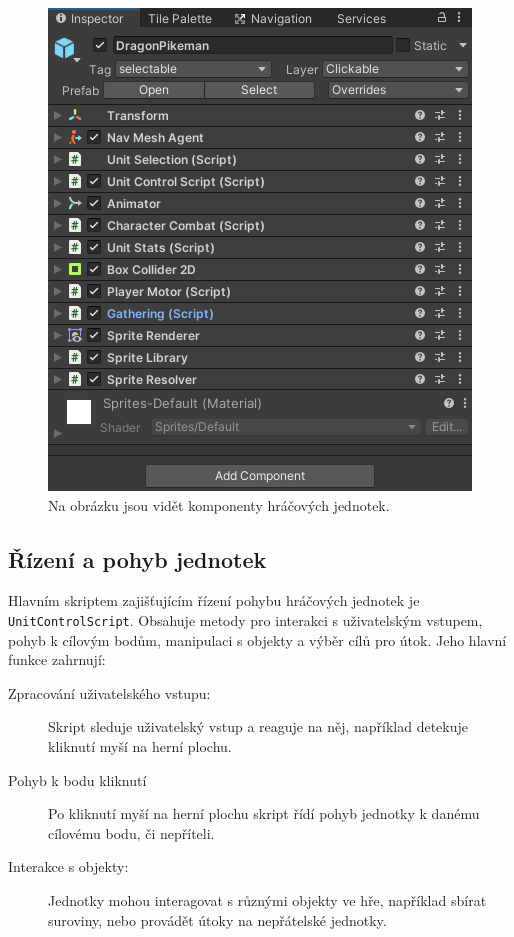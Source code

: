\begin{figure}[H]
	\centering
	\includegraphics[scale=1]{obrazky-figures/PlayerComponents.png}
	\caption{Na obrázku jsou vidět komponenty hráčových jednotek.}
	\label{PlayerScripts}
\end{figure}

\subsection{Řízení a pohyb jednotek}
Hlavním skriptem zajišťujícím řízení pohybu hráčových jednotek je \texttt{UnitControlScript}. Obsahuje metody pro interakci s uživatelským vstupem, pohyb k cílovým bodům, manipulaci s objekty a výběr cílů pro útok. Jeho hlavní funkce zahrnují:

\begin{description}
	\item [Zpracování uživatelského vstupu:] Skript sleduje uživatelský vstup a reaguje na něj, například detekuje kliknutí myší na herní plochu.
	\item [Pohyb k bodu kliknutí] Po kliknutí myší na herní plochu skript řídí pohyb jednotky k danému cílovému bodu, či nepříteli.
	\item [Interakce s objekty:] Jednotky mohou interagovat s různými objekty ve hře, například sbírat suroviny, nebo provádět útoky na nepřátelské jednotky.
\end{description}

